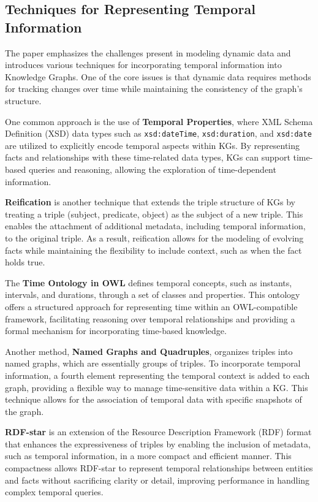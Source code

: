 \subsection{Techniques for Representing Temporal Information}

The paper emphasizes the challenges present in modeling dynamic data and introduces various techniques for incorporating temporal information into Knowledge Graphs. 
One of the core issues is that dynamic data requires methods for tracking changes over time while maintaining the consistency of the graph's structure.

One common approach is the use of \textbf{Temporal Properties}, where XML Schema Definition (XSD) data types such as \texttt{xsd:dateTime}, \texttt{xsd:duration}, and \texttt{xsd:date} 
are utilized to explicitly encode temporal aspects within KGs. By representing facts and relationships with these time-related data types, KGs can support time-based queries and 
reasoning, allowing the exploration of time-dependent information.

\textbf{Reification} is another technique that extends the triple structure of KGs by treating a triple (subject, predicate, object) as the subject of a new triple. This enables the 
attachment of additional metadata, including temporal information, to the original triple. As a result, reification allows for the modeling of evolving facts while maintaining the 
flexibility to include context, such as when the fact holds true.

The \textbf{Time Ontology in OWL} defines temporal concepts, such as instants, intervals, and durations, through a set of classes and properties. This ontology offers a structured 
approach for representing time within an OWL-compatible framework, facilitating reasoning over temporal relationships and providing a formal mechanism for incorporating time-based 
knowledge.

Another method, \textbf{Named Graphs and Quadruples}, organizes triples into named graphs, which are essentially groups of triples. To incorporate temporal information, a fourth 
element representing the temporal context is added to each graph, providing a flexible way to manage time-sensitive data within a KG. This technique allows for the association of 
temporal data with specific snapshots of the graph.

\textbf{RDF-star} is an extension of the Resource Description Framework (RDF) format that enhances the expressiveness of triples by enabling the inclusion of metadata, such as 
temporal information, in a more compact and efficient manner. This compactness allows RDF-star to represent temporal relationships between entities and facts without sacrificing 
clarity or detail, improving performance in handling complex temporal queries.


